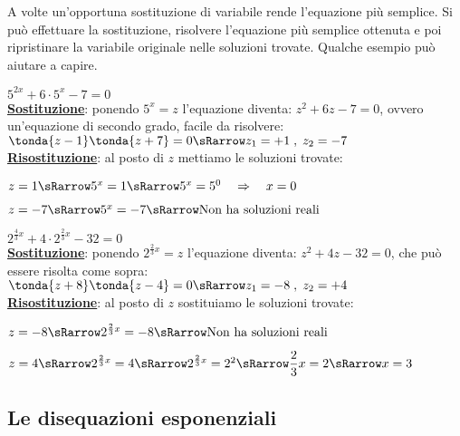 A volte un'opportuna sostituzione di variabile rende l'equazione più 
semplice. 
Si può effettuare la sostituzione, risolvere l'equazione più semplice 
ottenuta e 
poi ripristinare la variabile originale nelle soluzioni trovate. Qualche 
esempio può aiutare a capire.

\begin{esempio} 
\(5^{2x} +6 \cdot 5^x -7=0\) \\[4pt]
\textbf{\underline{Sostituzione}}:
ponendo \(5^x=z\) l'equazione diventa: \(z^2 +6z -7=0\), ovvero 
un'equazione di secondo grado, facile da risolvere:
\(\tonda{z-1} \tonda{z+7}=0 \sRarrow z_1=+1 \;,\; z_2=-7\) 
 \\[4pt]
\textbf{\underline{Risostituzione}}: al posto di \(z\) mettiamo le 
soluzioni trovate:

\(z = 1\sRarrow 5^x=1 \sRarrow 5^x=5^0\quad 
\Rightarrow \quad x=0\)

\(z = -7 \sRarrow 5^x=-7 \sRarrow \text{Non 
ha soluzioni reali}\)
\end{esempio}

\begin{esempio} 
\(2^{\frac{4}{3}x} +4 \cdot 2^{\frac{2}{3}x} -32=0\) \\[4pt]
\textbf{\underline{Sostituzione}}:
ponendo \(2^{\frac{2}{3}x}=z\) l'equazione diventa: \(z^2 +4z -32=0\), che 
può essere
risolta come sopra:
\(\tonda{z+8}\tonda{z-4}=0 \sRarrow z_1=-8 \;,\; z_2=+4\) 
\\[4pt]
\textbf{\underline{Risostituzione}}: al posto di \(z\) sostituiamo le 
soluzioni trovate:

\(z = -8\sRarrow 2^{\frac{2}{3}x}=-8 \sRarrow 
\text{Non ha soluzioni reali}\)

\(z = 4\sRarrow 2^{\frac{2}{3}x}=4 \sRarrow 
2^{\frac{2}{3}x}=2^2
\sRarrow\dfrac{2}{3}x=2 \sRarrow x=3\)
\end{esempio}

\subsection{Le disequazioni esponenziali}
\label{subsubsec:esplog_disequazioniesponenziali}

